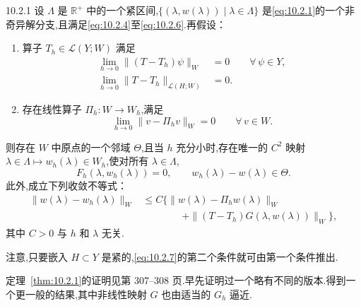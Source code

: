 \begin{theorem}[]{10.2.1}
设 \(\Lambda\) 是 \(\mathbb R^+\) 中的一个紧区间,\(\{(\lambda,w(\lambda))\mid\lambda\in\Lambda\}\) 是\eqref{eq:10.2.1}的一个非奇异解分支,且满足\eqref{eq:10.2.4}至\eqref{eq:10.2.6}.再假设：
\begin{enumerate}[label=\alph*.]
  \item 算子 \(T_h\in\mathcal L(Y;W)\) 满足
  \begin{equation}\label{eq:10.2.7}
    \begin{aligned}
      \lim_{h\to0}\|(T-T_h)\psi\|_W&=0\qquad\forall\,\psi\in Y,\\
      \lim_{h\to0}\|T-T_h\|_{\mathcal L(H;W)}&=0.
    \end{aligned}
  \end{equation}
  \item 存在线性算子 \(\Pi_h\colon W\to W_h\),满足
  \begin{equation}\label{eq:10.2.8}
    \lim_{h\to0}\|v-\Pi_hv\|_W=0\qquad\forall\,v\in W.
  \end{equation}
\end{enumerate}
则存在 \(W\) 中原点的一个邻域 \(\Theta\),且当 \(h\) 充分小时,存在唯一的 \(C^2\) 映射 \(\lambda\in\Lambda\mapsto w_h(\lambda)\in W_h\),使对所有 \(\lambda\in\Lambda\),
\begin{equation}\label{eq:10.2.9}
  F_h(\lambda,w_h(\lambda))=0,\qquad w_h(\lambda)-w(\lambda)\in\Theta.
\end{equation}
此外,成立下列收敛不等式：
\begin{equation}\label{eq:10.2.10}
  \begin{aligned}
    \|w(\lambda)-w_h(\lambda)\|_W
      &\le C\bigl\{\|w(\lambda)-\Pi_hw(\lambda)\|_W\\
      &\hspace{4em}+\|(T-T_h)G(\lambda,w(\lambda))\|_W\bigr\},
  \end{aligned}
\end{equation}
其中 \(C>0\) 与 \(h\) 和 \(\lambda\) 无关.
\end{theorem}

注意,只要嵌入 \(H\subset Y\) 是紧的,\eqref{eq:10.2.7}的第二个条件就可由第一个条件推出.

定理~\ref{thm:10.2.1}的证明见第 307–308 页.早先证明过一个略有不同的版本.得到一个更一般的结果,其中非线性映射 \(G\) 也由适当的 \(G_h\) 逼近.

